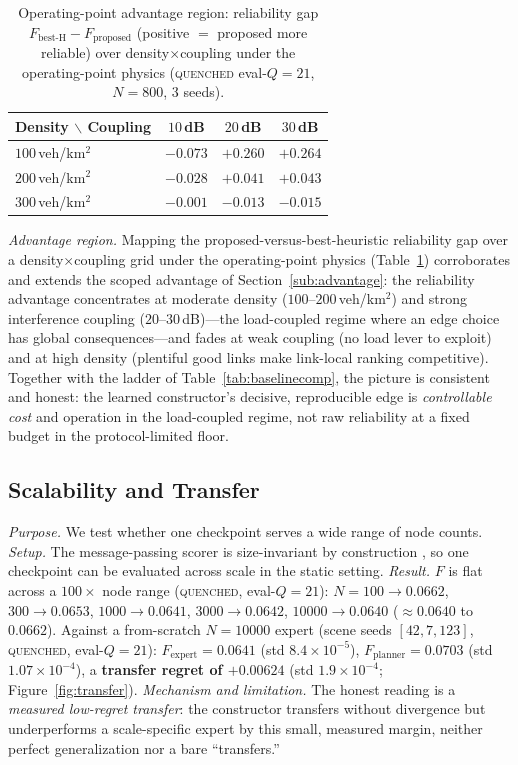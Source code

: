 \documentclass[journal]{IEEEtran}
\newcommand{\qq}{\textsc{quenched}}
\begin{document}
\begin{table}[t]
  \centering
  \caption{Operating-point advantage region: reliability gap
  $F_{\text{best-H}}{-}F_{\text{proposed}}$ (positive $=$ proposed more reliable)
  over density$\times$coupling under the operating-point physics (\qq{}
  eval-$Q{=}21$, $N{=}800$, 3 seeds).}
  \label{tab:advgrid}
  \small
  \setlength{\tabcolsep}{8pt}
  \begin{tabular}{lccc}
    \toprule
    Density $\backslash$ Coupling & $10$\,dB & $20$\,dB & $30$\,dB \\
    \midrule
    $100$\,veh/km$^2$ & $-0.073$ & $\mathbf{+0.260}$ & $\mathbf{+0.264}$ \\
    $200$\,veh/km$^2$ & $-0.028$ & $\mathbf{+0.041}$ & $\mathbf{+0.043}$ \\
    $300$\,veh/km$^2$ & $-0.001$ & $-0.013$          & $-0.015$ \\
    \bottomrule
  \end{tabular}
\end{table}

\emph{Advantage region.} Mapping the proposed-versus-best-heuristic reliability
gap over a density$\times$coupling grid under the operating-point physics
(Table~\ref{tab:advgrid}) corroborates and extends the scoped advantage of
Section~\ref{sub:advantage}: the reliability advantage concentrates at moderate
density ($100$--$200$\,veh/km$^2$) and strong interference coupling
($20$--$30$\,dB)---the load-coupled regime where an edge choice has global
consequences---and fades at weak coupling (no load lever to exploit) and at high
density (plentiful good links make link-local ranking competitive). Together with
the ladder of Table~\ref{tab:baselinecomp}, the picture is consistent and honest:
the learned constructor's decisive, reproducible edge is \emph{controllable cost}
and operation in the load-coupled regime, not raw reliability at a fixed budget in
the protocol-limited floor.

\subsection{Scalability and Transfer}\label{sub:transfer}

\emph{Purpose.} We test whether one checkpoint serves a wide range of node counts.
\emph{Setup.} The message-passing scorer is size-invariant by construction
\cite{PLACEHOLDER_graphsage_inductive}, so one checkpoint can be evaluated across
scale in the static setting. \emph{Result.} $F$ is flat across a $100\times$ node
range (\qq{}, eval-$Q{=}21$): $N{=}100\to0.0662$, $300\to0.0653$,
$1000\to0.0641$, $3000\to0.0642$, $10000\to0.0640$ ($\approx0.0640$ to $0.0662$).
Against a from-scratch $N{=}10000$ expert (scene seeds $[42,7,123]$, \qq{},
eval-$Q{=}21$): $F_{\text{expert}}=0.0641$ (std $8.4\times10^{-5}$),
$F_{\text{planner}}=0.0703$ (std $1.07\times10^{-4}$), a \textbf{transfer regret
of $+0.00624$} (std $1.9\times10^{-4}$; Figure~\ref{fig:transfer}).
\emph{Mechanism and limitation.} The honest reading is a \emph{measured low-regret
transfer}: the constructor transfers without divergence but underperforms a
scale-specific expert by this small, measured margin, neither perfect
generalization nor a bare ``transfers.''
\end{document}
